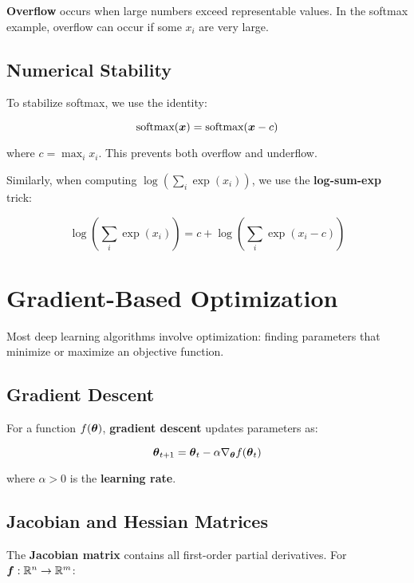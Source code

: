 \textbf{Overflow} occurs when large numbers exceed representable values. In the softmax example, overflow can occur if some $x_i$ are very large.

\subsection{Numerical Stability}

To stabilize softmax, we use the identity:

\begin{equation}
\text{softmax}(\boldsymbol{x}) = \text{softmax}(\boldsymbol{x} - c)
\end{equation}

where $c = \max_i x_i$. This prevents both overflow and underflow.

Similarly, when computing $\log(\sum_i \exp(x_i))$, we use the \textbf{log-sum-exp} trick:

\begin{equation}
\log\left(\sum_i \exp(x_i)\right) = c + \log\left(\sum_i \exp(x_i - c)\right)
\end{equation}

\section{Gradient-Based Optimization}
\label{sec:gradient-optimization}

Most deep learning algorithms involve optimization: finding parameters that minimize or maximize an objective function.

\subsection{Gradient Descent}

For a function $f(\boldsymbol{\theta})$, \textbf{gradient descent} updates parameters as:

\begin{equation}
\boldsymbol{\theta}_{t+1} = \boldsymbol{\theta}_t - \alpha \nabla_{\boldsymbol{\theta}} f(\boldsymbol{\theta}_t)
\end{equation}

where $\alpha > 0$ is the \textbf{learning rate}.

\subsection{Jacobian and Hessian Matrices}

The \textbf{Jacobian matrix} contains all first-order partial derivatives. For $\boldsymbol{f}: \mathbb{R}^n \to \mathbb{R}^m$:

